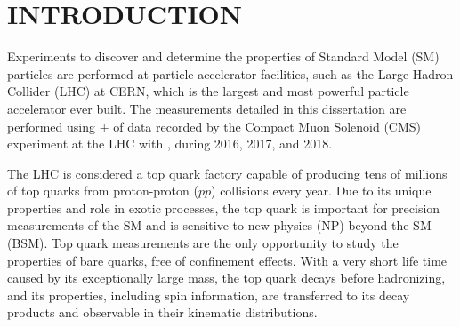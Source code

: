 
\chapter*{INTRODUCTION}
\label{Introduction}
Experiments to discover and determine the properties of Standard Model (SM) particles are performed at particle accelerator facilities, such as the Large Hadron Collider (LHC) at CERN, which is the largest and most powerful particle accelerator ever built.
The measurements detailed in this dissertation are performed using \lumivalueRuniiUL $\pm$ \lumierrRuniiUL of data recorded by the Compact Muon Solenoid (CMS) experiment at the LHC with \beamenergy, during 2016, 2017, and 2018.

The LHC is considered a top quark factory capable of producing tens of millions of top quarks from proton-proton ($pp$) collisions every year.
Due to its unique properties and role in exotic processes, the top quark is important for precision measurements of the SM and is sensitive to new physics (NP) beyond the SM (BSM).
Top quark measurements are the only opportunity to study the properties of bare quarks, free of confinement effects.
With a very short life time caused by its exceptionally large mass, the top quark decays before hadronizing, and its properties, including spin information, are transferred to its decay products and observable in their kinematic distributions.

